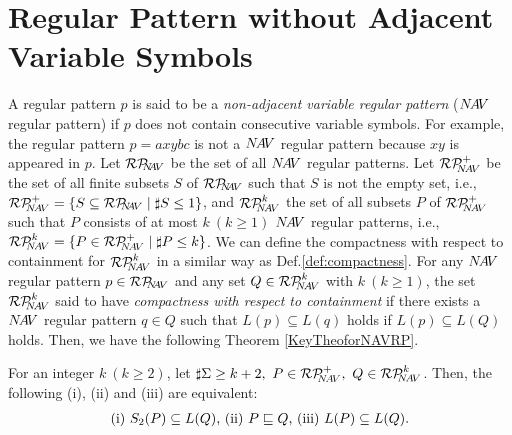 \section{Regular Pattern without Adjacent Variable Symbols}

A regular pattern $p$ is said to be a {\it non-adjacent variable regular pattern} ($N\!A\!V$ regular pattern)  
if $p$ does not contain consecutive variable symbols.
For example, the regular pattern $p=axybc$ is not a $N\!A\!V$ regular pattern because $xy$ is appeared in $p$.
Let $\mathcal{RP}_{\!\!\!N\!\!A\!V}$ be the set of all $N\!A\!V$ regular patterns.
Let $\mathcal{RP}^{+}_{\!\!\!N\!A\!V}$ be the set of all finite subsets $S$ of $\mathcal{RP}_{\!\!\!N\!\!A\!V}$ such that $S$ is not the empty set, i.e., $\NAVRPplus=\{S \subseteq \NAVRP \mid \sharp S \leq 1\}$,
and $\mathcal{RP}^{k}_{\!\!\!N\!A\!V}$ the set of all subsets $P$ of $\mathcal{RP}^{+}_{\!\!\!N\!A\!V}$ such that $P$ consists of at most $k~(k\geq 1)$ $N\!A\!V$ regular patterns, i.e., $\NAVRPkei=\{P\in \NAVRPplus \mid \sharp P \leq k\}$.
We can define the compactness with respect to containment for $\mathcal{RP}^{k}_{\!\!\!N\!A\!V}$ in a similar way as Def.\ref{def:compactness}.
 For any $N\!A\!V$ regular pattern $p \in \mathcal{RP}_{\!\!\!N\!\!A\!V}$ and any set $Q \in \mathcal{RP}^{k}_{\!\!\!N\!A\!V}$ with $k~(k\geq 1)$,
  the set $\mathcal{RP}^{k}_{\!\!\!N\!A\!V}$ said to have {\it compactness with respect to containment}
  if there exists a $N\!A\!V$ regular pattern $q \in Q$ such that $L(p) \subseteq L(q)$ holds if $L(p) \subseteq L(Q)$ holds.
Then, we have the following Theorem \ref{KeyTheoforNAVRP}.

\begin{thm}\label{KeyTheoforNAVRP}%
For an integer $k~(k\ge 2)$, let $\sharp \Sigma \ge k+2,~P\in \NAVRPplus,~Q \in \NAVRPkei$.  
Then, the following (i), (ii) and (iii) are equivalent:
\[
\begin{tabular}{ll}
(i) $S_{2}(P) \subseteq L(Q)$,
(ii) $P \sqsubseteq Q$,
(iii) $L(P) \subseteq L(Q)$.
\end{tabular}
\]
\end{thm}

